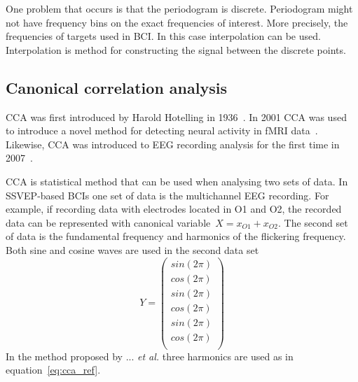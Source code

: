 One problem that occurs is that the periodogram is discrete. Periodogram might not have frequency bins on the exact frequencies of interest. More precisely, the frequencies of targets used in \gls{BCI}. In this case interpolation can be used. Interpolation is method for constructing the signal between the discrete points.

\subsection{Canonical correlation analysis}

\Gls{CCA} was first introduced by Harold Hotelling in 1936~\cite{cca_hotelling}. In 2001 \gls{CCA} was used to introduce a novel method for detecting neural activity in \gls{fMRI} data~\cite{cca_fmri}. Likewise, \gls{CCA} was introduced to \gls{EEG} recording analysis for the first time in 2007~\cite{cca_lin}. 

\Gls{CCA} is statistical method that can be used when analysing two sets of data. In \gls{SSVEP}-based \glspl{BCI} one set of data is the multichannel \gls{EEG} recording. For example, if recording data with electrodes located in O1 and O2, the recorded data can be represented with canonical variable~$X=x_{O1}+x_{O2}$. The second set of data is the \gls{fundamental} frequency and \glspl{harmonic} of the \gls{flickering} frequency. Both sine and cosine waves are used in the second data set %
\begin{equation}
	\label{eq:cca_ref}
	Y=\left(\begin{matrix}
		sin(2\pi)\\
		cos(2\pi)\\
		sin(2\pi)\\
		cos(2\pi)\\
		sin(2\pi)\\
		cos(2\pi)\\
	\end{matrix}\right)
\end{equation}
In the method proposed by ... \textit{et al.} three harmonics are used as in equation~\ref{eq:cca_ref}.
